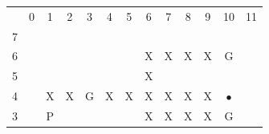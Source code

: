 \documentclass[11pt]{exam}
\begin{document}
\begin{table}[H]
	\centering
	\begin{tabular}{ccccccccccccc}
		&
		0 &
		1 &
		2 &
		3 &
		4 &
		5 &
		6 &
		7 &
		8 &
		9 &
		10 &
		11 \\ \cline{2-9}
		\multicolumn{1}{c|}{7} &
		\multicolumn{1}{c|}{\cellcolor[HTML]{000000}} &
		\multicolumn{1}{c|}{\cellcolor[HTML]{000000}} &
		\multicolumn{1}{c|}{\cellcolor[HTML]{000000}} &
		\multicolumn{1}{c|}{\cellcolor[HTML]{000000}} &
		\multicolumn{1}{c|}{\cellcolor[HTML]{000000}} &
		\multicolumn{1}{c|}{\cellcolor[HTML]{000000}} &
		\multicolumn{1}{c|}{\cellcolor[HTML]{000000}} &
		\multicolumn{1}{c|}{\cellcolor[HTML]{000000}} &
		\cellcolor[HTML]{000000} &
		\cellcolor[HTML]{000000} &
		\cellcolor[HTML]{000000} &
		\cellcolor[HTML]{000000} \\ \cline{2-12}
		\multicolumn{1}{c|}{6} &
		\multicolumn{1}{c|}{\cellcolor[HTML]{000000}} &
		\multicolumn{1}{c|}{} &
		\multicolumn{1}{c|}{} &
		\multicolumn{1}{c|}{} &
		\multicolumn{1}{c|}{} &
		\multicolumn{1}{c|}{} &
		\multicolumn{1}{c|}{X} &
		\multicolumn{1}{c|}{X} &
		\multicolumn{1}{c|}{X} &
		\multicolumn{1}{c|}{X} &
		\multicolumn{1}{c|}{G} &
		\cellcolor[HTML]{000000} \\ \cline{2-12}
		\multicolumn{1}{c|}{5} &
		\multicolumn{1}{c|}{\cellcolor[HTML]{000000}} &
		\multicolumn{1}{c|}{} &
		\multicolumn{1}{c|}{} &
		\multicolumn{1}{c|}{} &
		\multicolumn{1}{c|}{} &
		\multicolumn{1}{c|}{} &
		\multicolumn{1}{c|}{X} &
		\multicolumn{1}{c|}{\cellcolor[HTML]{000000}} &
		\multicolumn{1}{c|}{\cellcolor[HTML]{000000}} &
		\multicolumn{1}{c|}{\cellcolor[HTML]{000000}} &
		\multicolumn{1}{c|}{\cellcolor[HTML]{000000}} &
		\cellcolor[HTML]{000000} \\ \cline{2-12}
		\multicolumn{1}{c|}{4} &
		\multicolumn{1}{c|}{\cellcolor[HTML]{000000}} &
		\multicolumn{1}{c|}{X} &
		\multicolumn{1}{c|}{X} &
		\multicolumn{1}{c|}{G} &
		\multicolumn{1}{c|}{X} &
		\multicolumn{1}{c|}{X} &
		\multicolumn{1}{c|}{X} &
		\multicolumn{1}{c|}{X} &
		\multicolumn{1}{c|}{X} &
		\multicolumn{1}{c|}{X} &
		\multicolumn{1}{c|}{$\bullet$} &
		\cellcolor[HTML]{000000} \\ \cline{2-12}
		\multicolumn{1}{c|}{3} &
		\multicolumn{1}{c|}{\cellcolor[HTML]{000000}} &
		\multicolumn{1}{c|}{P} &
		\multicolumn{1}{c|}{} &
		\multicolumn{1}{c|}{} &
		\multicolumn{1}{c|}{} &
		\multicolumn{1}{c|}{} &
		\multicolumn{1}{c|}{X} &
		\multicolumn{1}{c|}{X} &
		\multicolumn{1}{c|}{X} &
		\multicolumn{1}{c|}{X} &
		\multicolumn{1}{c|}{G} &
		\cellcolor[HTML]{000000} \\ \cline{2-12}

\end{tabular}
\end{table}
\end{document}
